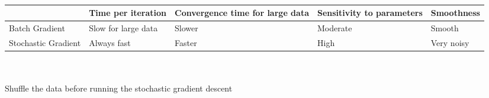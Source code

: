 \documentclass[a4paper]{article}
\begin{document}
\\
\begin{tabular}{p{2cm}|p{2cm}|p{2cm}|p{2cm}|p{2cm}}
&Time per iteration &	Convergence time for large data	& Sensitivity to parameters	& Smoothness\\
\hline
Batch Gradient	& Slow for large data	& Slower	& Moderate	& Smooth\\
\hline
Stochastic Gradient &	Always fast & 	Faster & High & Very noisy\\
\end{tabular}
\\

\\
Shuffle the data before running the stochastic gradient descent\\
\end{document}
